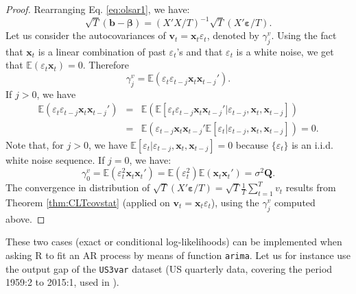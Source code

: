 \documentclass[
  12pt,
]{book}
\newenvironment{Shaded}{\begin{snugshade}}{\end{snugshade}}
\newcommand{\AttributeTok}[1]{\textcolor[rgb]{0.77,0.63,0.00}{#1}}
\newcommand{\DecValTok}[1]{\textcolor[rgb]{0.00,0.00,0.81}{#1}}
\newcommand{\FunctionTok}[1]{\textcolor[rgb]{0.00,0.00,0.00}{#1}}
\newcommand{\NormalTok}[1]{#1}
\newcommand{\OtherTok}[1]{\textcolor[rgb]{0.56,0.35,0.01}{#1}}
\newcommand{\SpecialCharTok}[1]{\textcolor[rgb]{0.00,0.00,0.00}{#1}}
\newcommand{\StringTok}[1]{\textcolor[rgb]{0.31,0.60,0.02}{#1}}
\theoremstyle{definition}
\theoremstyle{definition}
\theoremstyle{definition}
\theoremstyle{definition}
\theoremstyle{remark}
\begin{document}
\begin{proof}
Rearranging Eq. \eqref{eq:olsar1}, we have:
\[
\sqrt{T}(\mathbf{b}-\boldsymbol{\beta}) =  (X'X/T)^{-1}\sqrt{T}(X'\boldsymbol\varepsilon/T).
\]
Let us consider the autocovariances of \(\mathbf{v}_t = \mathbf{x}_t \varepsilon_t\), denoted by \(\gamma^v_j\). Using the fact that \(\mathbf{x}_t\) is a linear combination of past \(\varepsilon_t\)'s and that \(\varepsilon_t\) is a white noise, we get that \(\mathbb{E}(\varepsilon_t\mathbf{x}_t)=0\). Therefore
\[
\gamma^v_j = \mathbb{E}(\varepsilon_t\varepsilon_{t-j}\mathbf{x}_t\mathbf{x}_{t-j}').
\]
If \(j>0\), we have
\begin{eqnarray*}
\mathbb{E}(\varepsilon_t\varepsilon_{t-j}\mathbf{x}_t\mathbf{x}_{t-j}')&=&\mathbb{E}(\mathbb{E}[\varepsilon_t\varepsilon_{t-j}\mathbf{x}_t\mathbf{x}_{t-j}'|\varepsilon_{t-j},\mathbf{x}_t,\mathbf{x}_{t-j}])\\
&=&\mathbb{E}(\varepsilon_{t-j}\mathbf{x}_t\mathbf{x}_{t-j}'\mathbb{E}[\varepsilon_t|\varepsilon_{t-j},\mathbf{x}_t,\mathbf{x}_{t-j}])=0.
\end{eqnarray*}
Note that, for \(j>0\), we have \(\mathbb{E}[\varepsilon_t|\varepsilon_{t-j},\mathbf{x}_t,\mathbf{x}_{t-j}]=0\) because \(\{\varepsilon_t\}\) is an i.i.d. white noise sequence. If \(j=0\), we have:
\[
\gamma^v_0 = \mathbb{E}(\varepsilon_t^2\mathbf{x}_t\mathbf{x}_{t}')= \mathbb{E}(\varepsilon_t^2) \mathbb{E}(\mathbf{x}_t\mathbf{x}_{t}')=\sigma^2\mathbf{Q}.
\]
The convergence in distribution of \(\sqrt{T}(X'\boldsymbol\varepsilon/T)=\sqrt{T}\frac{1}{T}\sum_{t=1}^Tv_t\) results from Theorem \ref{thm:CLTcovstat} (applied on \(\mathbf{v}_t=\mathbf{x}_t\varepsilon_t\)), using the \(\gamma_j^v\) computed above.
\end{proof}

These two cases (exact or conditional log-likelihoods) can be implemented when asking R to fit an AR process by means of function \texttt{arima}. Let us for instance use the output gap of the \texttt{US3var} dataset (US quarterly data, covering the period 1959:2 to 2015:1, used in \citet{Gourieroux_Monfort_Renne_2017}).

\begin{Shaded}
\end{Shaded}
\end{document}
